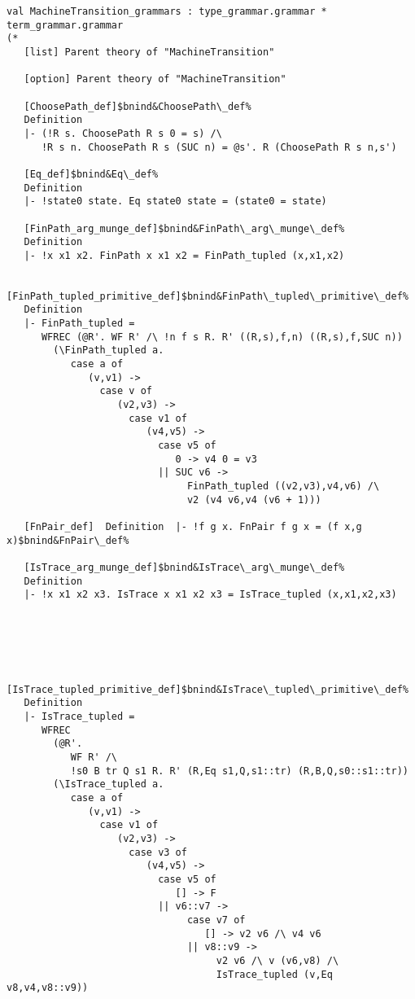 \documentclass[12pt]{article}
\begin{document}
\begin{footnotesize}
\begin{Verbatim}[commandchars=\$\&\%]
  val MachineTransition_grammars : type_grammar.grammar * term_grammar.grammar
(*
   [list] Parent theory of "MachineTransition"
   
   [option] Parent theory of "MachineTransition"
   
   [ChoosePath_def]$bnind&ChoosePath\_def%
   Definition
   |- (!R s. ChoosePath R s 0 = s) /\
      !R s n. ChoosePath R s (SUC n) = @s'. R (ChoosePath R s n,s')
   
   [Eq_def]$bnind&Eq\_def%
   Definition
   |- !state0 state. Eq state0 state = (state0 = state)
   
   [FinPath_arg_munge_def]$bnind&FinPath\_arg\_munge\_def%
   Definition
   |- !x x1 x2. FinPath x x1 x2 = FinPath_tupled (x,x1,x2)
   
   [FinPath_tupled_primitive_def]$bnind&FinPath\_tupled\_primitive\_def%
   Definition
   |- FinPath_tupled =
      WFREC (@R'. WF R' /\ !n f s R. R' ((R,s),f,n) ((R,s),f,SUC n))
        (\FinPath_tupled a.
           case a of
              (v,v1) ->
                case v of
                   (v2,v3) ->
                     case v1 of
                        (v4,v5) ->
                          case v5 of
                             0 -> v4 0 = v3
                          || SUC v6 ->
                               FinPath_tupled ((v2,v3),v4,v6) /\
                               v2 (v4 v6,v4 (v6 + 1)))
   
   [FnPair_def]  Definition  |- !f g x. FnPair f g x = (f x,g x)$bnind&FnPair\_def%
   
   [IsTrace_arg_munge_def]$bnind&IsTrace\_arg\_munge\_def%
   Definition
   |- !x x1 x2 x3. IsTrace x x1 x2 x3 = IsTrace_tupled (x,x1,x2,x3)
   




   [IsTrace_tupled_primitive_def]$bnind&IsTrace\_tupled\_primitive\_def%
   Definition
   |- IsTrace_tupled =
      WFREC
        (@R'.
           WF R' /\
           !s0 B tr Q s1 R. R' (R,Eq s1,Q,s1::tr) (R,B,Q,s0::s1::tr))
        (\IsTrace_tupled a.
           case a of
              (v,v1) ->
                case v1 of
                   (v2,v3) ->
                     case v3 of
                        (v4,v5) ->
                          case v5 of
                             [] -> F
                          || v6::v7 ->
                               case v7 of
                                  [] -> v2 v6 /\ v4 v6
                               || v8::v9 ->
                                    v2 v6 /\ v (v6,v8) /\
                                    IsTrace_tupled (v,Eq v8,v4,v8::v9))
   

\end{Verbatim}
\end{footnotesize}
\end{document}
